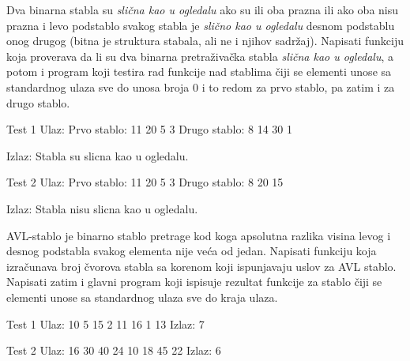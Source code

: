 \begin{Answer}[ref=712]
\end{Answer}



\begin{Exercise}[label=713]
Dva binarna stabla su {\em slična kao u ogledalu} ako su ili oba prazna ili ako oba nisu prazna i levo podstablo svakog stabla je {\em slično kao u ogledalu} desnom podstablu onog drugog (bitna je struktura stabala, ali ne i njihov sadržaj). Napisati funkciju koja proverava da li su dva binarna pretraživačka stabla {\em slična kao u ogledalu}, a potom i program koji testira rad funkcije nad stablima čiji se elementi unose sa standardnog ulaza sve do unosa broja 0 i to redom za prvo stablo, pa zatim i za drugo stablo. 

\begin{miditest}
\begin{test}{Test 1}
Ulaz: 
Prvo stablo: 11 20 5 3
Drugo stablo: 8 14 30 1

Izlaz: 
Stabla su slicna kao u ogledalu.
\end{test}
\end{miditest}

\begin{miditest}
\begin{test}{Test 2}
Ulaz: 
Prvo stablo: 11 20 5 3
Drugo stablo: 8 20 15

Izlaz: 
Stabla nisu slicna kao u ogledalu.
\end{test}
\end{miditest}
\end{Exercise}

\begin{Answer}[ref=713]
\end{Answer}


\begin{Exercise}[label=714]
AVL-stablo je binarno stablo pretrage kod koga apsolutna razlika visina levog i desnog podstabla svakog elementa
nije veća od jedan. Napisati funkciju  koja izračunava broj čvorova stabla sa korenom  koji ispunjavaju uslov za AVL stablo. Napisati zatim i glavni program koji ispisuje rezultat  funkcije za stablo čiji se elementi unose sa standardnog ulaza sve do kraja ulaza.

\begin{miditest}
\begin{test}{Test 1}
Ulaz: 
10 5 15 2 11 16 1 13
Izlaz: 
7
\end{test}
\end{miditest}
\begin{miditest}
\begin{test}{Test 2}
Ulaz: 
16 30 40 24 10 18 45 22
Izlaz: 
6
\end{test}
\end{miditest}
\end{Exercise}

